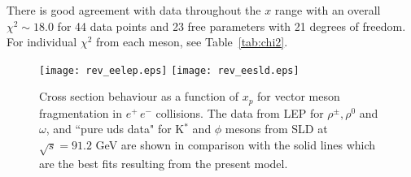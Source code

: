 \documentclass{ws-ijmpa}
\begin{document}
There is good agreement with data throughout the $x$ range with an
overall $\chi^2 \sim 18.0 $ for 44 data points and 23 free parameters
with 21 degrees of freedom. For individual $\chi^2$ from each meson,
see Table~\ref{tab:chi2}.

\begin{figure}[htp]
\texttt{[image: rev\_eelep.eps]}
\texttt{[image: rev\_eesld.eps]}
\caption{Cross section behaviour as a function of $x_p$ for vector
meson fragmentation in $e^+\,e^-$ collisions. The data from
LEP\protect\cite{Data,Rho1,Rho2,Rho3,Rho5,Omega1,Omega2}
for $\rho^{\pm}, \rho^0$ and $\omega$, and ``pure uds data" for K$^*$
and $\phi$ mesons from SLD\protect\cite{SLD1,SLD2} at $\sqrt{s}
= 91.2$ GeV are shown in comparison with the solid lines which are the
best fits resulting from the present model.}
\label{fig:ee}
\end{figure}
\end{document}
